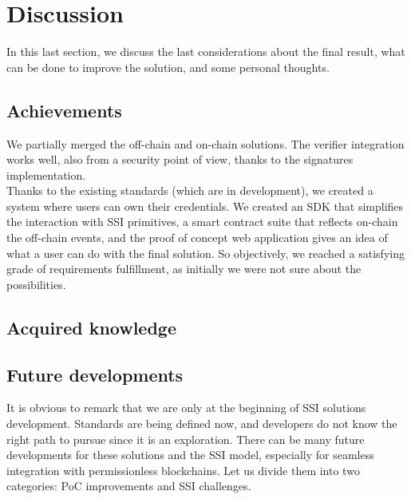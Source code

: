\section{Discussion}
In this last section, we discuss the last considerations about the final result, what 
can be done to improve the solution, and some personal thoughts.

\subsection{Achievements}
We partially merged the off-chain and on-chain solutions. The verifier integration works well,
also from a security point of view, thanks to the signatures implementation.\\
Thanks to the existing standards (which are in development), we created a system where 
users can own their credentials. We created an SDK that simplifies the interaction with 
SSI primitives, a smart contract suite that reflects on-chain the off-chain events, and 
the proof of concept web application gives an idea of what a user can do with the final 
solution.
So objectively, we reached a satisfying grade of requirements fulfillment, as initially
we were not sure about the possibilities.

\subsection{Acquired knowledge}

\subsection{Future developments}
It is obvious to remark that we are only at the beginning of SSI solutions development. 
Standards are being defined now, and developers do not know the right path to pursue 
since it is an exploration.
There can be many future developments for these solutions and the SSI model, especially
for seamless integration with permissionless blockchains. Let us divide them into two 
categories: PoC improvements and SSI challenges.
